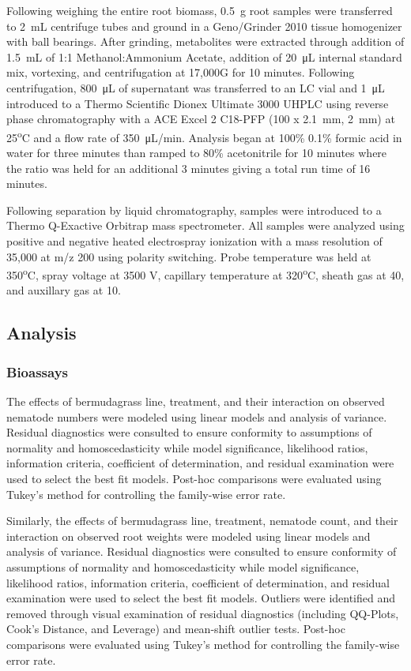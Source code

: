 \documentclass[9pt,lineno]{elife}
\begin{document}
Following weighing the entire root biomass, \SI{0.5}{\gram} root samples were transferred to \SI{2}{\milli\liter} centrifuge tubes and ground in a Geno/Grinder 2010 tissue homogenizer with ball bearings.  After grinding, metabolites were extracted through addition of \SI{1.5}{\milli\liter} of 1:1 Methanol:Ammonium Acetate, addition of \SI{20}{\micro\liter} internal standard mix, vortexing, and centrifugation at 17,000G for 10 minutes.  Following centrifugation, \SI{800}{\micro\liter} of supernatant was transferred to an LC vial and \SI{1}{\micro\liter} introduced to a Thermo Scientific Dionex Ultimate 3000 UHPLC using reverse phase chromatography with a ACE Excel 2 C18-PFP (100 x \SI{2.1}{\milli\meter}, \SI{2}{\milli\meter}) at 25\textsuperscript{o}C and a flow rate of \SI{350}{\micro\liter}/min.  Analysis began at 100\% 0.1\% formic acid in water for three minutes than ramped to 80\% acetonitrile for 10 minutes where the ratio was held for an additional 3 minutes giving a total run time of 16 minutes.  

Following separation by liquid chromatography, samples were introduced to a Thermo Q-Exactive Orbitrap mass spectrometer.  All samples were analyzed using positive and negative heated electrospray ionization with a mass resolution of 35,000 at m/z 200 using polarity switching. Probe temperature was held at 350\textsuperscript{o}C, spray voltage at 3500 V, capillary temperature at 320\textsuperscript{o}C, sheath gas at 40, and auxillary gas at 10.  


\subsection{Analysis}

\subsubsection{Bioassays}

The effects of bermudagrass line, treatment, and their interaction on observed nematode numbers were modeled using linear models and analysis of variance.  Residual diagnostics were consulted to ensure conformity to assumptions of normality and homoscedasticity while model significance, likelihood ratios, information criteria, coefficient of determination, and residual examination were used to select the best fit models.  Post-hoc comparisons were evaluated using Tukey's method for controlling the family-wise error rate. 

Similarly, the effects of bermudagrass line, treatment, nematode count, and their interaction on observed root weights were modeled using linear models and analysis of variance. Residual diagnostics were consulted to ensure conformity of assumptions of normality and homoscedasticity while model significance, likelihood ratios, information criteria, coefficient of determination, and residual examination were used to select the best fit models.  Outliers were identified and removed through visual examination of residual diagnostics (including QQ-Plots, Cook's Distance, and Leverage) and mean-shift outlier tests.  Post-hoc comparisons were evaluated using Tukey's method for controlling the family-wise error rate.
\end{document}
